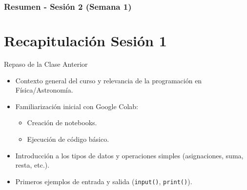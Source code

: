 \documentclass[10pt]{beamer}
\begin{document}
\myfront{}

\begin{frame}
  \titlepage
\end{frame}

\begin{frame}
  \frametitle{Resumen - Sesión 2 (Semana 1)}
  \tableofcontents
\end{frame}


\section{Recapitulación Sesión 1}

\begin{frame}{Repaso de la Clase Anterior}
  \begin{itemize}
    \item Contexto general del curso y relevancia de la programación en Física/Astronomía.
    \item Familiarización inicial con Google Colab:
      \begin{itemize}
        \item Creación de notebooks.
        \item Ejecución de código básico.
      \end{itemize}
    \item Introducción a los tipos de datos y operaciones simples (asignaciones, suma, resta, etc.).
    \item Primeros ejemplos de entrada y salida (\texttt{input()}, \texttt{print()}).
  \end{itemize}
\end{frame}
\end{document}
